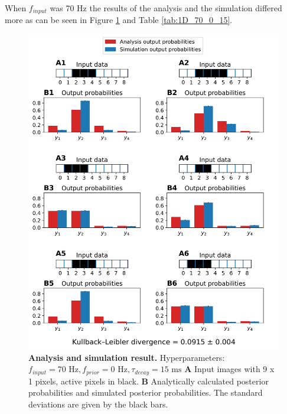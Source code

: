 When $f_{input}$ was 70 Hz the results of the analysis and the simulation differed more as can be seen in Figure \ref{fig:1D_70_0_15} and Table \ref{tab:1D_70_0_15}.

\begin{figure}
  \includegraphics[width=\linewidth]{figures/1D/1D_70_0_15.png}
    \caption{\textbf{Analysis and simulation result. } Hyperparameters: $f_{input} = 70\text{ Hz}, f_{prior} = 0\text{ Hz}, \tau_{decay} = 15\text{ ms}$ \textbf{A} Input images with 9 x 1 pixels, active pixels in black. \textbf{B} Analytically calculated posterior probabilities and simulated posterior probabilities. The standard deviations are given by the black bars.}
  \label{fig:1D_70_0_15}
\end{figure}

